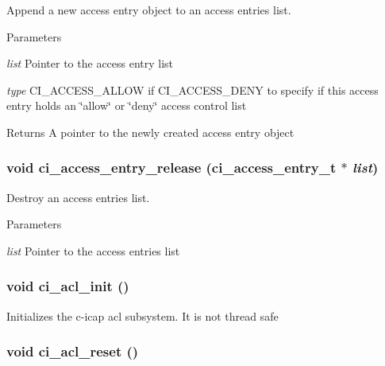 Append a new access entry object to an access entries list. 
\begin{DoxyParams}{Parameters}
\item[{\em list}]Pointer to the access entry list \item[{\em type}]CI\_\-ACCESS\_\-ALLOW if CI\_\-ACCESS\_\-DENY to specify if this access entry holds an \char`\"{}allow\char`\"{} or \char`\"{}deny\char`\"{} access control list \end{DoxyParams}
\begin{DoxyReturn}{Returns}
A pointer to the newly created access entry object 
\end{DoxyReturn}
\hypertarget{group__ACL_ga46037760b7492e44238569bfce1174d8}{
\subsubsection[{ci\_\-access\_\-entry\_\-release}]{\setlength{\rightskip}{0pt plus 5cm}void ci\_\-access\_\-entry\_\-release ({\bf ci\_\-access\_\-entry\_\-t} $\ast$ {\em list})}}
\label{group__ACL_ga46037760b7492e44238569bfce1174d8}


Destroy an access entries list. 
\begin{DoxyParams}{Parameters}
\item[{\em list}]Pointer to the access entries list \end{DoxyParams}
\hypertarget{group__ACL_ga41b34ceca3b185d3211b93247b9740e4}{
\subsubsection[{ci\_\-acl\_\-init}]{\setlength{\rightskip}{0pt plus 5cm}void ci\_\-acl\_\-init ()}}
\label{group__ACL_ga41b34ceca3b185d3211b93247b9740e4}


Initializes the c-\/icap acl subsystem. It is not thread safe \hypertarget{group__ACL_gafaff86f39deca56d4cfa2b86e9a333d9}{
\subsubsection[{ci\_\-acl\_\-reset}]{\setlength{\rightskip}{0pt plus 5cm}void ci\_\-acl\_\-reset ()}}
\label{group__ACL_gafaff86f39deca56d4cfa2b86e9a333d9}


